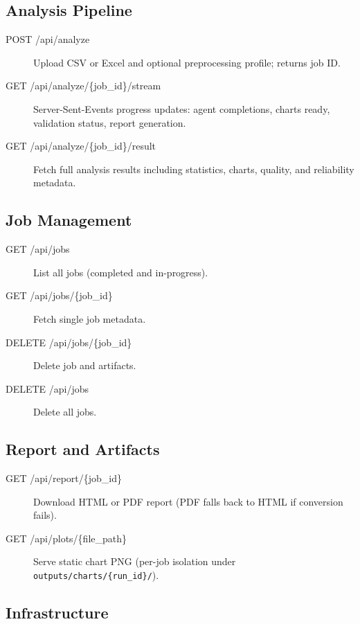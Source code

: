 \documentclass[12pt,a4paper,openany]{report}
\begin{document}
\subsection{Analysis Pipeline}

\begin{description}
	\item[POST /api/analyze] Upload CSV or Excel and optional preprocessing profile; returns job ID.
	\item[GET /api/analyze/\{job\_id\}/stream] Server-Sent-Events progress updates: agent completions, charts ready, validation status, report generation.
	\item[GET /api/analyze/\{job\_id\}/result] Fetch full analysis results including statistics, charts, quality, and reliability metadata.
\end{description}

\subsection{Job Management}

\begin{description}
	\item[GET /api/jobs] List all jobs (completed and in-progress).
	\item[GET /api/jobs/\{job\_id\}] Fetch single job metadata.
	\item[DELETE /api/jobs/\{job\_id\}] Delete job and artifacts.
	\item[DELETE /api/jobs] Delete all jobs.
\end{description}

\subsection{Report and Artifacts}

\begin{description}
	\item[GET /api/report/\{job\_id\}] Download HTML or PDF report (PDF falls back to HTML if conversion fails).
	\item[GET /api/plots/\{file\_path\}] Serve static chart PNG (per-job isolation under \texttt{outputs/charts/\{run\_id\}/}).
\end{description}

\subsection{Infrastructure}
\end{document}
